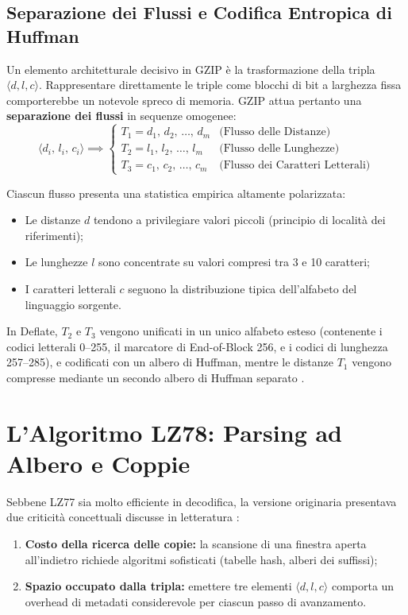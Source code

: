 \FloatBarrier
\subsection{Separazione dei Flussi e Codifica Entropica di Huffman}
\label{subsec:gzip-huffman-flussi}

Un elemento architetturale decisivo in GZIP \`e la trasformazione della tripla $\langle d, l, c \rangle$. Rappresentare direttamente le triple come blocchi di bit a larghezza fissa comporterebbe un notevole spreco di memoria. GZIP attua pertanto una \textbf{separazione dei flussi} in sequenze omogenee:
\begin{equation}
  \langle d_i, \, l_i, \, c_i \rangle \implies
  \begin{cases}
    T_1 = d_1, \, d_2, \, \dots, \, d_m & \text{(Flusso delle Distanze)} \\
    T_2 = l_1, \, l_2, \, \dots, \, l_m & \text{(Flusso delle Lunghezze)} \\
    T_3 = c_1, \, c_2, \, \dots, \, c_m & \text{(Flusso dei Caratteri Letterali)}
  \end{cases}
\end{equation}

Ciascun flusso presenta una statistica empirica altamente polarizzata:
\begin{itemize}
  \item Le distanze $d$ tendono a privilegiare valori piccoli (principio di localit\`a dei riferimenti);
  \item Le lunghezze $l$ sono concentrate su valori compresi tra 3 e 10 caratteri;
  \item I caratteri letterali $c$ seguono la distribuzione tipica dell'alfabeto del linguaggio sorgente.
\end{itemize}
In Deflate, $T_2$ e $T_3$ vengono unificati in un unico alfabeto esteso (contenente i codici letterali 0--255, il marcatore di End-of-Block 256, e i codici di lunghezza 257--285), e codificati con un albero di Huffman, mentre le distanze $T_1$ vengono compresse mediante un secondo albero di Huffman separato \cite{huffman1952}.

\FloatBarrier
\section{L'Algoritmo LZ78: Parsing ad Albero e Coppie}
\label{sec:algoritmo-lz78}

Sebbene LZ77 sia molto efficiente in decodifica, la versione originaria presentava due criticit\`a concettuali discusse in letteratura \cite{ziv1978}:
\begin{enumerate}
  \item \textbf{Costo della ricerca delle copie:} la scansione di una finestra aperta all'indietro richiede algoritmi sofisticati (tabelle hash, alberi dei suffissi);
  \item \textbf{Spazio occupato dalla tripla:} emettere tre elementi $\langle d, l, c \rangle$ comporta un overhead di metadati considerevole per ciascun passo di avanzamento.
\end{enumerate}

